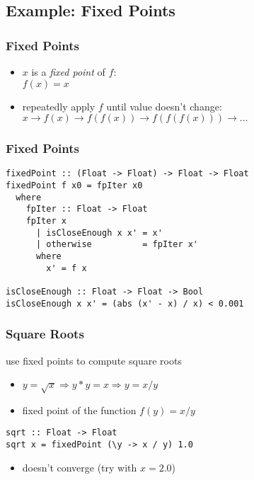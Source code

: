 \documentclass[dvipsnames]{beamer}
\theoremstyle{plain}
\begin{document}
\subsection{Example: Fixed Points}

\begin{frame}
  \frametitle{Fixed Points}

  \begin{itemize}
    \item $x$ is a \emph{fixed point} of $f$:\\
      $f(x)=x$

    \medskip
    \item repeatedly apply $f$ until value doesn't change:\\
      $x \rightarrow f(x) \rightarrow f(f(x)) \rightarrow f(f(f(x)))
      \rightarrow \ldots$
  \end{itemize}
\end{frame}

\begin{frame}[fragile]
  \frametitle{Fixed Points}

  \begin{lstlisting}[deletekeywords={next}]
fixedPoint :: (Float -> Float) -> Float -> Float
fixedPoint f x0 = fpIter x0
  where
    fpIter :: Float -> Float
    fpIter x
      | isCloseEnough x x' = x'
      | otherwise          = fpIter x'
      where
        x' = f x

isCloseEnough :: Float -> Float -> Bool
isCloseEnough x x' = (abs (x' - x) / x) < 0.001
  \end{lstlisting}
\end{frame}

\begin{frame}[fragile]
  \frametitle{Square Roots}

  \begin{exampleblock}{use fixed points to compute square roots}
    \begin{itemize}
      \item $y = \sqrt{x} \Rightarrow y * y = x \Rightarrow y = x / y$
      \item fixed point of the function $f(y) = x / y$
    \end{itemize}

    \smallskip
    \begin{lstlisting}[deletekeywords={sqrt}]
sqrt :: Float -> Float
sqrt x = fixedPoint (\y -> x / y) 1.0
    \end{lstlisting}
  \end{exampleblock}

  \pause
  \begin{itemize}
    \item doesn't converge (try with $x=2.0$)
  \end{itemize}
\end{frame}
\end{document}
